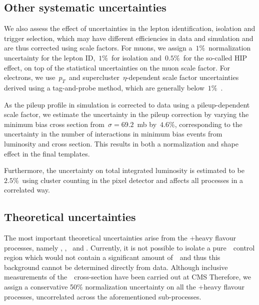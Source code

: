 \subsection{Other systematic uncertainties}
We also assess the effect of uncertainties in the lepton identification, isolation and trigger selection, which may have different efficiencies in data and simulation and are thus corrected using scale factors. For muons, we assign a~$1\%$~normalization uncertainty for the lepton ID,~$1\%$~for isolation and~$0.5\%$~for the so-called HIP effect, on top of the statistical uncertainties on the muon scale factor\cite{CMS:2017_mu_sf}. For electrons, we use~$p_T$~and supercluster~$\eta$-dependent scale factor uncertainties derived using a tag-and-probe method, which are generally below~$1\%$~\cite{CMS:2017_ele_sf}.

As the pileup profile in simulation is corrected to data using a pileup-dependent scale factor, we estimate the uncertainty in the pileup correction by varying the minimum bias cross section from~$\sigma = 69.2$~mb by~$4.6\%$, corresponding to the uncertainty in the number of interactions in minimum bias events from luminosity and cross section\cite{CMS:2017_pu_weight_twiki}. This results in both a normalization and shape effect in the final templates.

Furthermore, the uncertainty on total integrated luminosity is estimated to be~$2.5\%$~using cluster counting in the pixel detector and affects all processes\cite{CMS:2017sdi,CMS:2017_lumi} in a correlated way.

\subsection{Theoretical uncertainties}
The most important theoretical uncertainties arise from the \ttbar+heavy flavour processes, namely \ttbb, \tttwob, \ttb~and \ttcc. Currently, it is not possible to isolate a pure~\ttbb~control region which would not contain a significant amount of~\ttHbb~and thus this background cannot be determined directly from data. Although inclusive measurements of the~\ttbb~cross-section have been carried out at CMS Therefore, we assign a conservative 50\% normalization uncertainty on all the \ttbar+heavy flavour processes, uncorrelated across the aforementioned sub-processes.

